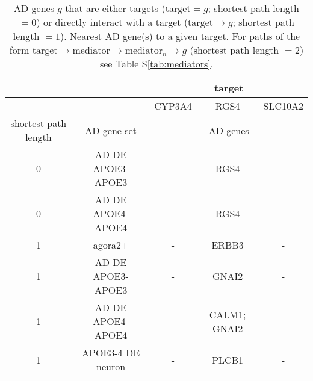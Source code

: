 \documentclass[letterpaper]{article}
\begin{document}
\begin{table}[p]
\begin{tabular}{cc||c|c|c}
\toprule
                       &                     &  \multicolumn{3}{c}{target}        \\
\midrule
                       &   {}                &  CYP3A4 &          RGS4 &  SLC10A2 \\
\midrule
shortest path length   & AD gene set         &  \multicolumn{3}{c}{AD genes}        \\
\midrule
                    0  &   AD DE APOE3-APOE3 &    -    &          RGS4 &    -     \\
                    0  &   AD DE APOE4-APOE4 &    -    &          RGS4 &    -     \\
\midrule
                    1  &   agora2+           &    -    &         ERBB3 &    -     \\
                    1  &   AD DE APOE3-APOE3 &    -    &         GNAI2 &    -     \\
                    1  &   AD DE APOE4-APOE4 &    -    &  CALM1; GNAI2 &    -     \\
                    1  &   APOE3-4 DE neuron &    -    &         PLCB1 &    -     \\
\bottomrule
\end{tabular}
\caption{
  AD genes $g$ that are either targets ($\mathrm{target} = g$; shortest path length $=0$) or directly
  interact with a target ($\mathrm{target} \rightarrow g$; shortest path length $=1$).
  Nearest AD gene(s) to a given target.  For paths of the form $\mathrm{target}
  \rightarrow \mathrm{mediator} \rightarrow
  \mathrm{mediator}_n \rightarrow g$ (shortest path length $= 2$) see Table
  S\ref{tab:mediators}.
}
\label{tab:nearest-ADgenes}
\end{table}
\end{document}
